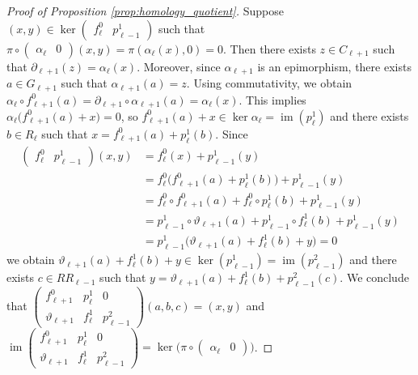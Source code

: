 \documentclass[english,a4paper,nolineno,cleveref]{socg-lipics-v2021}
\DeclareMathOperator{\im}{im}
\begin{document}
\begin{proof}[Proof of Proposition \ref{prop:homology_quotient}]
Suppose $(x,y)\in \ker\begin{pmatrix}f^0_\ell & p_{\ell\minus 1}^1\end{pmatrix}$ such that $\pi\circ \begin{pmatrix}\alpha_\ell & 0\end{pmatrix}(x,y)=\pi(\alpha_\ell(x),0)=0$. Then there exists $z\in C_{\ell+1}$ such that $\partial_{\ell+1}(z)=\alpha_\ell(x)$. Moreover, since $\alpha_{\ell+1}$ is an epimorphism, there exists $a\in G_{\ell+1}$ such that $\alpha_{\ell+1}(a)=z$. Using commutativity, we obtain $\alpha_\ell\circ f^0_{\ell+1}(a)=\partial_{\ell+1}\circ \alpha_{\ell+1}(a)=\alpha_\ell(x)$. This implies $\alpha_\ell\big(f^0_{\ell+1}(a)+x\big)=0$, so $f^0_{\ell+1}(a)+x\in\ker\alpha_\ell=\im(p^1_\ell)$ and there exists $b\in R_\ell$ such that $x=f^0_{\ell+1}(a)+p^1_\ell(b)$. Since 
\begin{equation*}
\begin{aligned}
\begin{pmatrix}f^0_\ell & p_{\ell\minus 1}^1\end{pmatrix}(x,y)&=f^0_\ell(x)+p^1_{\ell\minus 1}(y)\\&=f^0_\ell\big(f^0_{\ell+1}(a)+p^1_\ell(b)\big)+p^1_{\ell\minus 1}(y)\\&=f^0_\ell\circ f^0_{\ell+1}(a)+f^0_\ell\circ p^1_\ell(b)+p^1_{\ell\minus 1}(y)\\&=p^1_{\ell\minus 1}\circ \vartheta_{\ell+1}(a)+p^1_{\ell\minus 1}\circ f^1_\ell(b)+p^1_{\ell\minus 1}(y)\\&=p^1_{\ell\minus 1}\big(\vartheta_{\ell+1}(a)+f^1_\ell(b)+y\big)=0
\end{aligned}
\end{equation*}
we obtain $\vartheta_{\ell+1}(a)+f^1_\ell(b)+y\in\ker(p^1_{\ell\minus 1})=\im(p^2_{\ell\minus 1})$ and there exists $c\in RR_{\ell\minus 1}$ such that $y=\vartheta_{\ell+1}(a)+f^1_{\ell}(b)+p^2_{\ell\minus 1}(c)$. We conclude that $\begin{pmatrix}f^0_{\ell+1} & p^1_{\ell} & 0 \\ \vartheta_{\ell+1} & f^1_\ell & p^2_{\ell\minus 1}\end{pmatrix}(a,b,c)=(x,y)$ and $\im\begin{pmatrix}f^0_{\ell+1} & p^1_{\ell} & 0 \\ \vartheta_{\ell+1} & f^1_\ell & p^2_{\ell\minus 1}\end{pmatrix}=\ker\!\big(\pi\circ\begin{pmatrix}\alpha_\ell & 0\end{pmatrix}\big)$.
\end{proof}
\end{document}
